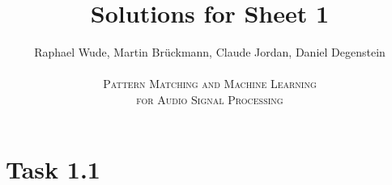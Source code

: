 \documentclass[12pt]{article}
\begin{document}
\title{Solutions for Sheet 1}
\author{Raphael Wude, Martin Brückmann, Claude Jordan, Daniel Degenstein\\ \\
\textsc{Pattern Matching and Machine Learning} \\
\textsc{for Audio Signal Processing}}
\maketitle

\section*{Task 1.1}
\end{document}
